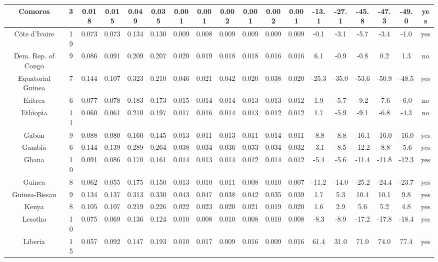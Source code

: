 \documentclass[10pt]{article}
\begin{document}
\begin{center}
\begin{tabular}{|c|c|c|c|c|c|c|c|c|c|c|c|c|c|c|c|c|c|}
\hline
Comoros & 3 & 0.018 & 0.015 & 0.049 & 0.035 & 0.001 & 0.001 & 0.002 & 0.001 & 0.002 & 0.001 & -13.1 & -27.1 & -45.8 & -47.3 & -49.0 & yes \\
\hline
Côte d'Ivoire & 19 & 0.073 & 0.073 & 0.134 & 0.130 & 0.009 & 0.008 & 0.009 & 0.009 & 0.009 & 0.009 & -0.1 & -3.1 & -5.7 & -3.4 & -1.0 & yes \\
\hline
Dem. Rep. of Congo & 9 & 0.086 & 0.091 & 0.209 & 0.207 & 0.020 & 0.019 & 0.018 & 0.018 & 0.016 & 0.016 & 6.1 & -0.9 & -0.8 & 0.2 & 1.3 & no \\
\hline
Equatorial Guinea & 7 & 0.144 & 0.107 & 0.323 & 0.210 & 0.046 & 0.021 & 0.042 & 0.020 & 0.038 & 0.020 & -25.3 & -35.0 & -53.6 & -50.9 & -48.5 & yes \\
\hline
Eritrea & 6 & 0.077 & 0.078 & 0.183 & 0.173 & 0.015 & 0.014 & 0.014 & 0.013 & 0.013 & 0.012 & 1.9 & -5.7 & -9.2 & -7.6 & -6.0 & no \\
\hline
Ethiopia & 11 & 0.060 & 0.061 & 0.210 & 0.197 & 0.017 & 0.016 & 0.014 & 0.013 & 0.012 & 0.012 & 1.7 & -5.9 & -9.1 & -6.8 & -4.3 & no \\
\hline
Gabon & 9 & 0.088 & 0.080 & 0.160 & 0.145 & 0.013 & 0.011 & 0.013 & 0.011 & 0.014 & 0.011 & -8.8 & -8.8 & -16.1 & -16.0 & -16.0 & yes \\
\hline
Gambia & 6 & 0.144 & 0.139 & 0.289 & 0.264 & 0.038 & 0.034 & 0.036 & 0.033 & 0.034 & 0.032 & -3.1 & -8.5 & -12.2 & -8.8 & -5.6 & yes \\
\hline
Ghana & 10 & 0.091 & 0.086 & 0.170 & 0.161 & 0.014 & 0.013 & 0.014 & 0.012 & 0.014 & 0.012 & -5.4 & -5.6 & -11.4 & -11.8 & -12.3 & yes \\
\hline
Guinea & 8 & 0.062 & 0.055 & 0.175 & 0.150 & 0.013 & 0.010 & 0.011 & 0.008 & 0.010 & 0.007 & -11.2 & -14.0 & -25.2 & -24.4 & -23.7 & yes \\
\hline
Guinea-Bissau & 9 & 0.134 & 0.137 & 0.313 & 0.330 & 0.043 & 0.047 & 0.038 & 0.042 & 0.035 & 0.039 & 1.7 & 5.3 & 10.4 & 10.1 & 9.8 & yes \\
\hline
Kenya & 8 & 0.105 & 0.107 & 0.219 & 0.226 & 0.022 & 0.023 & 0.020 & 0.021 & 0.019 & 0.020 & 1.6 & 2.9 & 5.6 & 5.2 & 4.8 & yes \\
\hline
Lesotho & 10 & 0.075 & 0.069 & 0.136 & 0.124 & 0.010 & 0.008 & 0.010 & 0.008 & 0.010 & 0.008 & -8.3 & -8.9 & -17.2 & -17.8 & -18.4 & yes \\
\hline
Liberia & 15 & 0.057 & 0.092 & 0.147 & 0.193 & 0.010 & 0.017 & 0.009 & 0.016 & 0.009 & 0.016 & 61.4 & 31.0 & 71.0 & 74.0 & 77.4 & yes \\

\end{tabular}
\end{center}
\end{document}
